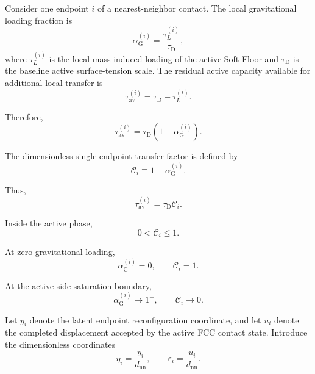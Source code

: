 Consider one endpoint $i$ of a nearest-neighbor contact. The local gravitational loading fraction is
\begin{equation}
    \alpha_{\mathrm{G}}^{(i)} = \frac{\tau_L^{(i)}}{\tau_{\mathrm{D}}},
\end{equation}
where $\tau_L^{(i)}$ is the local mass-induced loading of the active Soft Floor and $\tau_{\mathrm{D}}$ is the baseline active surface-tension scale. The residual active capacity available for additional local transfer is
\begin{equation}
    \tau_{\mathrm{av}}^{(i)} = \tau_{\mathrm{D}} - \tau_L^{(i)}.
\end{equation}

Therefore,
\begin{equation}
    \tau_{\mathrm{av}}^{(i)} = \tau_{\mathrm{D}} \left( 1-\alpha_{\mathrm{G}}^{(i)} \right).
\end{equation}

The dimensionless single-endpoint transfer factor is defined by
\begin{equation}
    \mathcal{C}_i \equiv 1-\alpha_{\mathrm{G}}^{(i)}.
\end{equation}

Thus,
\begin{equation}
    \tau_{\mathrm{av}}^{(i)} = \tau_{\mathrm{D}}\mathcal{C}_i.
\end{equation}

Inside the active phase,
\begin{equation}
    0 < \mathcal{C}_i \leq 1.
\end{equation}

At zero gravitational loading,
\begin{equation}
    \alpha_{\mathrm{G}}^{(i)}=0, \qquad \mathcal{C}_i=1.
\end{equation}

At the active-side saturation boundary,
\begin{equation}
    \alpha_{\mathrm{G}}^{(i)}\rightarrow1^{-}, \qquad \mathcal{C}_i\rightarrow0.
\end{equation}

Let $y_i$ denote the latent endpoint reconfiguration coordinate, and let $u_i$ denote the completed displacement accepted by the active FCC contact state. Introduce the dimensionless coordinates
\begin{equation}
    \eta_i = \frac{y_i}{d_{\mathrm{nn}}}, \qquad \varepsilon_i = \frac{u_i}{d_{\mathrm{nn}}}.
\end{equation}

